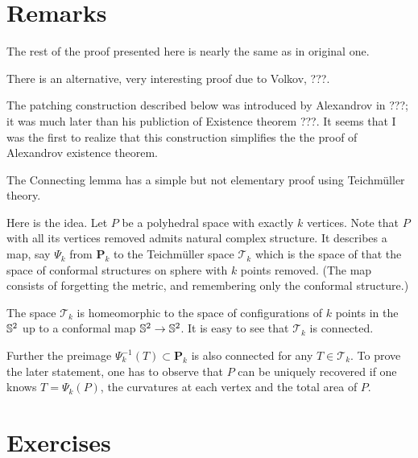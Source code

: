 \section{Remarks}

The rest of the proof presented here is nearly the same as in original one.

There is an alternative, very interesting proof due to Volkov,
???.

The patching construction described below was introduced by Alexandrov in ???;
it was much later than his publiction of Existence theorem ???. 
It seems that I was the first to realize that this construction simplifies the the proof of Alexandrov existence theorem.

The Connecting lemma has a simple but not elementary proof using Teichm\"uller theory.

Here is the idea.
Let $P$ be a polyhedral space with exactly $k$ vertices.
Note that $P$ with all its vertices removed admits natural complex structure.
It describes a map, say $\Psi_k$ from $\mathbf{P}_k$ to the Teichm\"uller space $\mathcal{T}_k$ which is the space of that the space of conformal structures on sphere with $k$ points removed.
(The map consists of forgetting the metric, and
remembering only the conformal structure.)

The space $\mathcal{T}_k$ is homeomorphic to the space of configurations of $k$ points in the $\mathbb{S}^2$
up to a conformal map $\mathbb{S}^2\to \mathbb{S}^2$.
It is easy to see that $\mathcal{T}_k$ is connected.

Further the preimage $\Psi_k^{-1}(T)\subset \mathbf{P}_k$ is also connected for any $T\in \mathcal{T}_k$.
To prove the later statement, one has to observe that $P$ can be uniquely recovered if one knows 
$T=\Psi_k(P)$,
the curvatures at each vertex 
and the total area of $P$.



\section*{Exercises}


